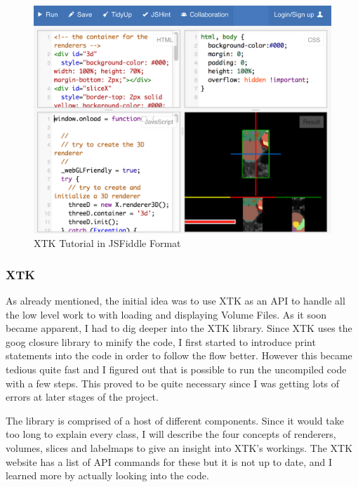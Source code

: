 \documentclass[a4paper,11pt,titlepage]{article}
\begin{document}
\begin{figure}[ht!]
\centering
\includegraphics[width=140mm]{graphics/jsFiddle_01.png}
\caption{XTK Tutorial in JSFiddle Format}
\label{fig:UIdesign1}
\end{figure}




\subsubsection{XTK}


As already mentioned, the initial idea was to use XTK as an API to handle all the low level work to with loading and displaying Volume Files. As it soon became apparent, I had to dig deeper into the XTK library. Since XTK uses the goog closure library to minify the code, I first started to introduce print statements into the code in order to follow the flow better. However this became tedious quite fast and I figured out that is possible to run the uncompiled code with a few steps. This proved to be quite necessary since I was getting lots of errors at later stages of the project.

The library is comprised of a host of different components. Since it would take too long to explain every class, I will describe the four concepts of renderers, volumes, slices and labelmaps to give an insight into XTK's workings. The XTK website has a list of API commands for these but it is not up to date, and I learned more by actually looking into the code.
\end{document}
